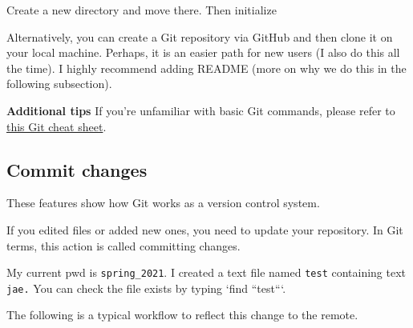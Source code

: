 \documentclass[
  letterpaper,
  DIV=11,
  numbers=noendperiod]{scrreprt}
\newenvironment{Shaded}{\begin{snugshade}}{\end{snugshade}}
\newcommand{\AttributeTok}[1]{\textcolor[rgb]{0.40,0.45,0.13}{#1}}
\newcommand{\CommentTok}[1]{\textcolor[rgb]{0.37,0.37,0.37}{#1}}
\newcommand{\ExtensionTok}[1]{\textcolor[rgb]{0.00,0.23,0.31}{#1}}
\newcommand{\NormalTok}[1]{\textcolor[rgb]{0.00,0.23,0.31}{#1}}
\newcommand{\StringTok}[1]{\textcolor[rgb]{0.13,0.47,0.30}{#1}}
\begin{document}
Create a new directory and move there. Then initialize

\begin{Shaded}
\end{Shaded}

Alternatively, you can create a Git repository via GitHub and then clone
it on your local machine. Perhaps, it is an easier path for new users (I
also do this all the time). I highly recommend adding README (more on
why we do this in the following subsection).

\begin{Shaded}
\end{Shaded}

\textbf{Additional tips} If you're unfamiliar with basic Git commands,
please refer to
\href{http://rogerdudler.GitHub.io/git-guide/files/git_cheat_sheet.pdf}{this
Git cheat sheet}.

\hypertarget{commit-changes}{%
\subsection*{Commit changes}\label{commit-changes}}

These features show how Git works as a version control system.

If you edited files or added new ones, you need to update your
repository. In Git terms, this action is called committing changes.

My current pwd is \texttt{spring\_2021}. I created a text file named
\texttt{test} containing text \texttt{jae.} You can check the file
exists by typing `find ``test```.

The following is a typical workflow to reflect this change to the
remote.

\begin{Shaded}
\end{Shaded}
\end{document}
